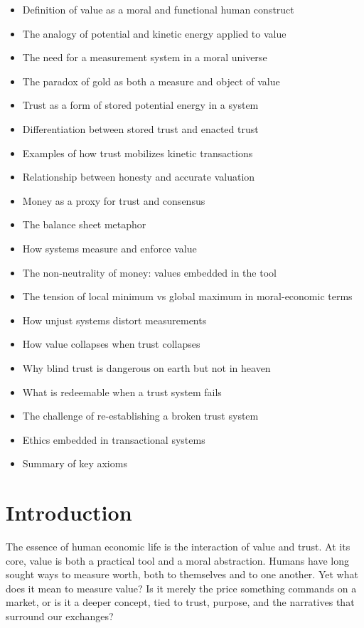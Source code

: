 \documentclass[11pt,oneside]{book}
\begin{document}
\begin{itemize}
\item Definition of value as a moral and functional human construct
\item The analogy of potential and kinetic energy applied to value
\item The need for a measurement system in a moral universe  
\item The paradox of gold as both a measure and object of value
\item Trust as a form of stored potential energy in a system
\item Differentiation between stored trust and enacted trust
\item Examples of how trust mobilizes kinetic transactions
\item Relationship between honesty and accurate valuation
\item Money as a proxy for trust and consensus
\item The balance sheet metaphor
\item How systems measure and enforce value
\item The non-neutrality of money: values embedded in the tool
\item The tension of local minimum vs global maximum in moral-economic terms
\item How unjust systems distort measurements
\item How value collapses when trust collapses
\item Why blind trust is dangerous on earth but not in heaven
\item What is redeemable when a trust system fails
\item The challenge of re-establishing a broken trust system
\item Ethics embedded in transactional systems
\item Summary of key axioms
\end{itemize}

\section{Introduction}

The essence of human economic life is the interaction of value and trust. At its core, value is both a practical tool and a moral abstraction. Humans have long sought ways to measure worth, both to themselves and to one another. Yet what does it mean to measure value? Is it merely the price something commands on a market, or is it a deeper concept, tied to trust, purpose, and the narratives that surround our exchanges?
\end{document}
